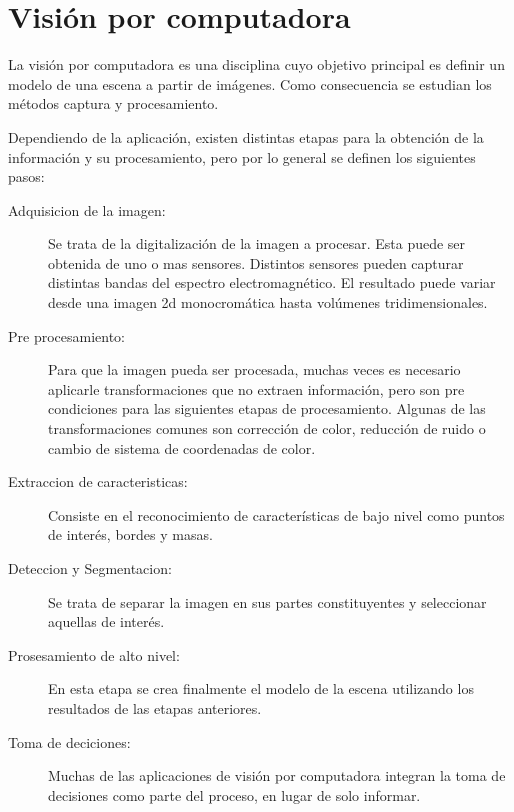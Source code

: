 
\section{Visión por computadora}

La visión por computadora es una disciplina cuyo objetivo principal es definir
un modelo de una escena a partir de imágenes\cite{cvLinda2001}. Como
consecuencia se estudian los métodos captura y procesamiento.

Dependiendo de la aplicación, existen distintas etapas para la obtención de la
información y su procesamiento, pero por lo general se definen los siguientes
pasos\cite{digitalImageProcessing2ed, wikiCV}:

\begin{description}

	\item[Adquisicion de la imagen:] Se trata de la digitalización de la
		imagen a procesar. Esta puede ser obtenida de uno o mas
		sensores. Distintos sensores pueden capturar distintas bandas
		del espectro electromagnético. El resultado puede variar desde
		una imagen 2d monocromática hasta volúmenes tridimensionales.

	\item[Pre procesamiento:] Para que la imagen pueda ser procesada, muchas
		veces es necesario aplicarle transformaciones que no extraen
		información, pero son pre condiciones para las siguientes etapas
		de procesamiento. Algunas de las transformaciones comunes son
		corrección de color, reducción de ruido o cambio de sistema de
		coordenadas de color.

	\item[Extraccion de caracteristicas:] Consiste en el reconocimiento de
		características de bajo nivel como puntos de interés, bordes y
		masas.

	\item[Deteccion y Segmentacion:] Se trata de separar la imagen en sus
		partes constituyentes y seleccionar aquellas de interés.

	\item[Prosesamiento de alto nivel:] En esta etapa se crea finalmente el
		modelo de la escena utilizando los resultados de las etapas
		anteriores.

	\item[Toma de deciciones:] Muchas de las aplicaciones de visión por
		computadora integran la toma de decisiones como parte del
		proceso, en lugar de solo informar.

\end{description}
